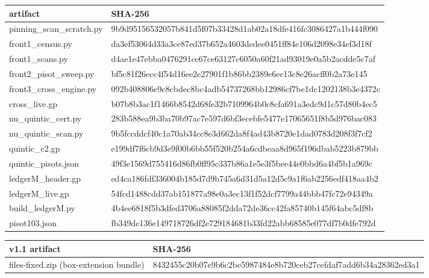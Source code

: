 \documentclass[11pt]{article}
\theoremstyle{definition}
\begin{document}
\begin{center}
\scriptsize\ttfamily
\begin{tabular}{ll}
\hline
artifact & SHA-256\\
\hline
pinning\_scan\_scratch.py & 9b9d95156532057b841d5f07b33428d1ab02a18dfe416fc3086427a1b444f090\\
front1\_census.py & da3ef53064d33a3ce87ed37b652a4603dedee0451ff84e106d2098e34ef3d18f\\
front1\_scans.py & d4ae1e47ebba0476291ce67ce63127c6050a60f21ad93019e0a5b2acdde5c7af\\
front2\_pisot\_sweep.py & bf5c81f26ecc4f54d16ee2e27901f1b86bb2389e6ec13c8e26acff0b2a73e145\\
front3\_cross\_engine.py & 092b408806e9c8cbdec8bc4adb54737268bb12986cf7be1dc1202138b3e4372c\\
cross\_live.gp & b07b8b3ac1f1466b8542d68fe32b7109964b0c8cfa691a3edc9d1c57d80b4ec5\\
nu\_quintic\_cert.py & 283b588ea9b3ba70b97ac7e597d6bf3ecebfe5477e17065651f8b5d976bac083\\
nu\_quintic\_scan.py & 9b5fccddcf40c1a70ab34cc8e3d662da8f4ad43b8720e1dad0783d208f3f7cf2\\
quintic\_c2.gp & e199df7f6cb9d3e9f00b6bb55f520b254a6cdbeaa8d965f196dbab5223b879bb\\
quintic\_pisots.json & 49f3e1569d755416d86fb0ff95c337b86a1e5e3f5bee44e0bbd6a4bf5b1a969c\\
ledgerM\_header.gp & ed4ca186fdf336004b185d7d9b745a6d31d5a12d5c9a1f6ab2256edf418aa4b2\\
ledgerM\_live.gp & 54fcd1488cdd37ab151877a98e0a3ec13f1f52dcf7799a44bbb47fc72e94349a\\
build\_ledgerM.py & 4b4ee6818f5b3dfed3706a88085f2dda72de36cc42fa85740b145f64abc5df8b\\
pisot103.json & fb349dc136e149718726df2e729184681b33fd22abb68585e077df7b0dfe792d\\
\hline
\end{tabular}
\end{center}

\begin{center}
\scriptsize\ttfamily
\begin{tabular}{ll}
\hline
v1.1 artifact & SHA-256\\
\hline
files-fixed.zip (box-extension bundle) & 8432455c20b07e9b6c2be5987484e8b720ceb27cefdaf7add6b34a28362ed3a1\\
\hline
\end{tabular}
\end{center}
\end{document}
